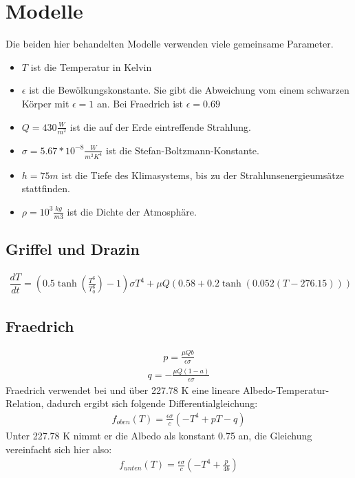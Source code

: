 \documentclass[]{report}
\begin{document}
\chapter{Modelle}
Die beiden hier behandelten Modelle verwenden viele gemeinsame Parameter.\\

\begin{itemize}
	\item $T$ ist die Temperatur in Kelvin
	\item $\epsilon$ ist die Bewölkungskonstante. Sie gibt die Abweichung vom einem schwarzen Körper mit $\epsilon=1$ an. Bei Fraedrich ist $\epsilon = 0.69$
	\item $Q = 430 \frac{W}{m^2}$ ist die auf der Erde eintreffende Strahlung.
	\item $\sigma = 5.67*10^{-8} \frac{W}{m^2K^4}$ ist die Stefan-Boltzmann-Konstante.
	\item $h = 75m$ ist die Tiefe des Klimasystems, bis zu der Strahlunsenergieumsätze stattfinden.
	\item $\rho = 10^3 \frac{kg}{m3}$ ist die Dichte der Atmosphäre.
 
\end{itemize}





\section{Griffel und Drazin}
	\begin{align}
		\dfrac{dT}{dt} = (0.5 \tanh\left(\frac{T^6}{T_0^6}\right)-1) \sigma T^4 + \mu Q (0.58 + 0.2 \tanh (0.052 (T - 276.15)))
	\end{align}
\section{Fraedrich}
	\begin{align}
		p=\frac{\mu Q b}{\epsilon \sigma}
	\end{align}
	\begin{align}
		q = - \frac{\mu Q (1-a)}{\epsilon \sigma}
	\end{align}
	Fraedrich verwendet bei und über 227.78 K eine lineare Albedo-Temperatur-Relation, dadurch ergibt sich folgende Differentialgleichung:
	\begin{align}
		f_{oben}(T) = \frac{\epsilon \sigma}{c} (-T^4 + p T - q)
	\end{align}
	Unter 227.78 K nimmt er die Albedo als konstant 0.75 an, die Gleichung vereinfacht sich hier also:
	\begin{align}
		f_{unten}(T) = \frac{\epsilon \sigma}{c} (-T^4 + \frac{p}{4b})
	\end{align}
\end{document}
